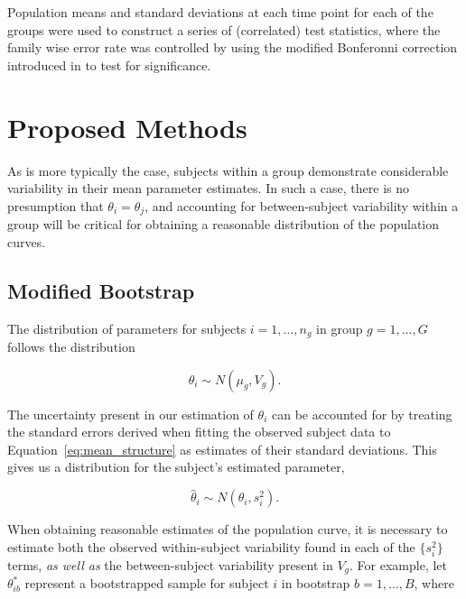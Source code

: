 Population means and standard deviations at each time point for each of the groups were used to construct a series of (correlated) test statistics, where the family wise error rate was controlled by using the modified Bonferonni correction introduced in \cite{oleson2017detecting} to test for significance.


\section{Proposed Methods}

As is more typically the case, subjects within a group demonstrate considerable variability in their mean parameter estimates. In such a case, there is no presumption that $\theta_i = \theta_j$, and accounting for between-subject variability within a group will be critical for obtaining a reasonable distribution of the population curves.

\subsection{Modified Bootstrap}


The distribution of parameters for subjects $i = 1, \dots, n_g$ in group $g = 1, \dots, G$ follows the distribution

\begin{equation}\label{eq:theta_i_dist}
\theta_i \sim N(\mu_{g}, V_{g}).
\end{equation}

The uncertainty present in our estimation of $\theta_i$ can be accounted for by treating the standard errors derived when fitting the observed subject data to Equation~\ref{eq:mean_structure} as estimates of their standard deviations. This gives us a distribution for the subject's estimated parameter, 

\begin{equation}
\hat{\theta}_i \sim N(\theta_i, s_i^2).
\end{equation}

When obtaining reasonable estimates of the population curve, it is necessary to estimate both the observed within-subject variability found in each of the $\{s_i^2\}$ terms, \textit{as well as} the between-subject variability present in $V_{g}$. For example, let $\theta^*_{ib}$ represent a bootstrapped sample for subject $i$ in bootstrap $b = 1, \dots, B$, where

